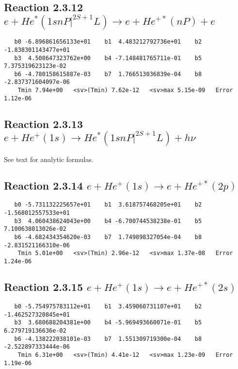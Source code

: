 \documentclass[12pt]{article}
\begin{document}
                              


\newpage
\subsection{
Reaction 2.3.12 $  e + He^*(1snP|^{2S+1}L) \rightarrow e + He^{+*}(nP) + e$}


\begin{small}\begin{verbatim}
   b0 -6.896861656133e+01    b1  4.483212792736e+01    b2 -1.838301143477e+01
   b3  4.508647323762e+00    b4 -7.148481765711e-01    b5  7.375319623123e-02
   b6 -4.780158615887e-03    b7  1.766513036839e-04    b8 -2.837371604097e-06
    Tmin 7.94e+00   <sv>(Tmin) 7.62e-12   <sv>max 5.15e-09   Error 1.12e-06
\end{verbatim}\end{small}

\newpage
\subsection{
Reaction 2.3.13 $  e + He^+(1s) \rightarrow He^*(1snP|^{2S+1}L) + h\nu$}

       See text for analytic formulas.

\newpage
\subsection{
Reaction 2.3.14 $  e + He^+(1s) \rightarrow e + He^{+*}(2p)$}


\begin{small}\begin{verbatim}
   b0 -5.731132225657e+01    b1  3.618757468205e+01    b2 -1.568012557533e+01
   b3  4.060438624043e+00    b4 -6.700744538238e-01    b5  7.100638013026e-02
   b6 -4.682434354620e-03    b7  1.749898327054e-04    b8 -2.831521166310e-06
    Tmin 5.01e+00   <sv>(Tmin) 2.96e-12   <sv>max 1.37e-08   Error 1.24e-06
\end{verbatim}\end{small}

\newpage
\subsection{
Reaction 2.3.15 $  e + He^+(1s) \rightarrow e + He^{+*}(2s)$}


\begin{small}\begin{verbatim}
   b0 -5.754975783112e+01    b1  3.459060731107e+01    b2 -1.462527320845e+01
   b3  3.680688204381e+00    b4 -5.969493660071e-01    b5  6.279719136636e-02
   b6 -4.138222038101e-03    b7  1.551309719300e-04    b8 -2.522897333444e-06
    Tmin 6.31e+00   <sv>(Tmin) 4.41e-12   <sv>max 1.23e-09   Error 1.19e-06
\end{verbatim}\end{small}
\end{document}
